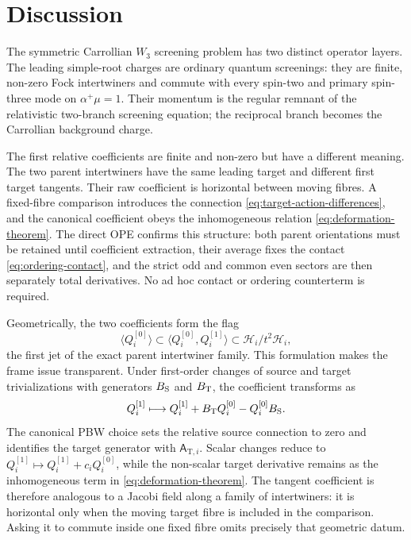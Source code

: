 \documentclass[11pt,a4paper]{article}
\numberwithin{equation}{section}
\theoremstyle{remark}
\newcommand{\T}{\mathrm{T}}
\begin{document}
\section{Discussion}
\label{sec:discussion}

The symmetric Carrollian $W_3$ screening problem has two distinct operator layers.  The
leading simple-root charges are ordinary quantum screenings: they are finite, non-zero Fock
intertwiners and commute with every spin-two and primary spin-three mode on
$\alpha^+\mu=1$.  Their momentum is the regular remnant of the relativistic two-branch
screening equation; the reciprocal branch becomes the Carrollian background charge.

The first relative coefficients are finite and non-zero but have a different meaning.  The two
parent intertwiners have the same leading target and different first target tangents.  Their raw
coefficient is horizontal between moving fibres.  A fixed-fibre comparison introduces the
connection \cref{eq:target-action-differences}, and the canonical coefficient obeys the
inhomogeneous relation \cref{eq:deformation-theorem}.  The direct OPE confirms this
structure: both parent orientations must be retained until coefficient extraction, their average
fixes the contact \cref{eq:ordering-contact}, and the strict odd and common even sectors are
then separately total derivatives.  No ad hoc contact or ordering counterterm is required.

Geometrically, the two coefficients form the flag
\begin{equation}
 \langle Q_i^{[0]}\rangle
 \subset
 \langle Q_i^{[0]},Q_i^{[1]}\rangle
 \subset \mathcal H_i/t^2\mathcal H_i,
 \label{eq:screening-flag}
\end{equation}
the first jet of the exact parent intertwiner family.  This formulation makes the frame issue
transparent.  Under first-order changes of source and target trivializations with generators
$B_{\rm S}$ and $B_{\rm T}$, the coefficient transforms as
\begin{equation}
 Q_i^{[1]}\longmapsto
 Q_i^{[1]}+B_{\rm T}Q_i^{[0]}-Q_i^{[0]}B_{\rm S}.
 \label{eq:frame-covariance}
\end{equation}
The canonical PBW choice sets the relative source connection to zero and identifies the target
generator with $\mathsf A_{\T,i}$.  Scalar changes reduce to
$Q_i^{[1]}\mapsto Q_i^{[1]}+c_iQ_i^{[0]}$, while the non-scalar target derivative remains as
the inhomogeneous term in \cref{eq:deformation-theorem}.  The tangent coefficient is therefore
analogous to a Jacobi field along a family of intertwiners: it is horizontal only when the
moving target fibre is included in the comparison.  Asking it to commute inside one fixed
fibre omits precisely that geometric datum.
\end{document}
